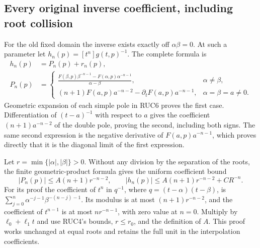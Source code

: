 \subsection{Every original inverse coefficient, including root collision}

For the old fixed domain the inverse exists exactly off
$\alpha\beta=0$.  At such a parameter let
$h_n(p)=[t^n]g(t,p)^{-1}$.  The complete formula is
\[
 \begin{aligned}
 h_n(p)&=P_n(p)+r_n(p),\\
 P_n(p)&=\begin{cases}
 \displaystyle\frac{F(\beta,p)\beta^{-n-1}
                   -F(\alpha,p)\alpha^{-n-1}}{\alpha-\beta},
                         &\alpha\ne\beta,\\[6pt]
 (n+1)F(a,p)a^{-n-2}-\partial_tF(a,p)a^{-n-1},
                         &\alpha=\beta=a\ne0.
 \end{cases}
 \end{aligned}\tag{RUC8}
\]
Geometric expansion of each simple pole in RUC6 proves the first
case.  Differentiation of $(t-a)^{-1}$ with respect to $a$ gives
the coefficient $(n+1)a^{-n-2}$ of the double pole, proving the
second, including both signs.  The same second expression is the
negative derivative of $F(a,p)a^{-n-1}$, which proves directly
that it is the diagonal limit of the first expression.

Let $r=\min\{|\alpha|,|\beta|\}>0$.  Without any division by
the separation of the roots, the finite geometric-product formula
gives the uniform coefficient bound
\[
 |P_n(p)|\le A(n+1)r^{-n-2},\qquad
 |h_n(p)|\le A(n+1)r^{-n-2}+CR^{-n}.
 \tag{RUC9}
\]
For its proof the coefficient of $t^n$ in $q^{-1}$, where
$q=(t-\alpha)(t-\beta)$, is
$\sum_{j=0}^n\alpha^{-j-1}\beta^{-(n-j)-1}$.
Its modulus is at most $(n+1)r^{-n-2}$, and the coefficient of
$t^{n-1}$ is at most $nr^{-n-1}$, with zero value at $n=0$.
Multiply by $\ell_0+\ell_1t$ and use RUC4's bounds, $r\le r_0$,
and the definition of $A$.  This proof works unchanged at equal
roots and retains the full unit in the interpolation coefficients.

